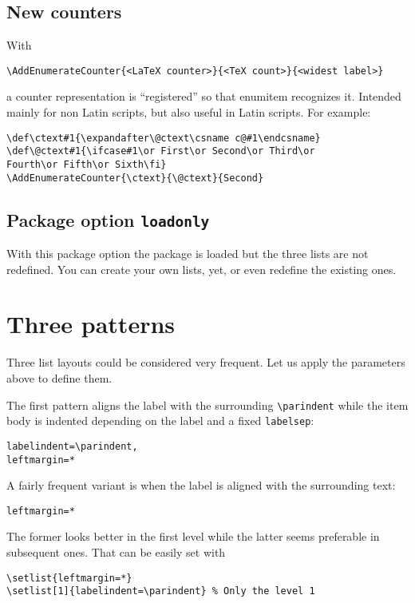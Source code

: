 \documentclass{article}
\begin{document}
\subsection{New counters}

With
\begin{verbatim}
\AddEnumerateCounter{<LaTeX counter>}{<TeX count>}{<widest label>}
\end{verbatim}
a counter representation is ``registered'' so that \textsf{enumitem}
recognizes it.  Intended mainly for non Latin scripts, but also useful
in Latin scripts.  For example:
\begin{verbatim}
\def\ctext#1{\expandafter\@ctext\csname c@#1\endcsname}
\def\@ctext#1{\ifcase#1\or First\or Second\or Third\or
Fourth\or Fifth\or Sixth\fi}
\AddEnumerateCounter{\ctext}{\@ctext}{Second}
\end{verbatim}

\subsection{Package option \texttt{loadonly}}

With this package option the package is loaded but the three
lists are not redefined. You can create your own lists, yet, or
even redefine the existing ones.

\section{Three patterns}

Three list layouts could be considered very
frequent. Let us apply the parameters above to define them.

The first pattern aligns the label with the surrounding
\verb|\parindent| while the item body is indented depending
on the label and a fixed \verb|labelsep|:
\begin{verbatim}
labelindent=\parindent,
leftmargin=*
\end{verbatim}
A fairly frequent variant is when  the label is aligned with
the surrounding text:
\begin{verbatim}
leftmargin=*
\end{verbatim}
The former looks better in the first level while the latter
seems preferable in subsequent ones. That can be easily
set with
\begin{verbatim}
\setlist{leftmargin=*}
\setlist[1]{labelindent=\parindent} % Only the level 1
\end{verbatim}
\end{document}
